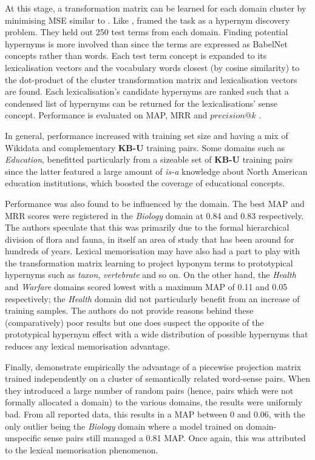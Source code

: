 At this stage, a transformation matrix can be learned for each domain cluster by minimising \ac{MSE} similar to \citep{Fu2014}.  Like \citeauthor{ustalov2017negative}, \citeauthor{espinosa2016supervised} framed the task as a hypernym discovery problem.  They held out 250 test terms from each domain.  Finding potential hypernyms is more involved than \citep{ustalov2017negative} since the terms are expressed as BabelNet concepts rather than words.  Each test term concept is expanded to its lexicalisation vectors and the vocabulary words closest (by cosine similarity) to the dot-product of the cluster transformation matrix and lexicalisation vectors are found.  Each lexicalisation’s candidate hypernyms are ranked such that a condensed list of hypernyms can be returned for the lexicalisations’ sense concept.  Performance is evaluated on \ac{MAP}, \ac{MRR} and $precision@k$ .

In general, performance increased with training set size and having a mix of Wikidata and complementary \textbf{KB-U} training pairs.   Some domains such as \textit{Education}, benefitted particularly from a sizeable set of \textbf{KB-U} training pairs since the latter featured a large amount of \textit{is-a} knowledge about North American education institutions, which boosted the coverage of educational concepts.

Performance was also found to be influenced by the domain.  The best \ac{MAP} and \ac{MRR} scores were registered in the \textit{Biology} domain at 0.84 and 0.83 respectively.  The authors speculate that this was primarily due to the formal hierarchical division of flora and fauna, in itself an area of study that has been around for hundreds of years.  Lexical memorisation \citep{levy2015supervised} may have also had a part to play with the transformation matrix learning to project hyponym terms to prototypical hypernyms such as \textit{taxon}, \textit{vertebrate} and so on.   On the other hand, the \textit{Health} and \textit{Warfare} domains scored lowest with a maximum \ac{MAP} of 0.11 and 0.05 respectively; the \textit{Health} domain did not particularly benefit from an increase of training samples.  The authors do not provide reasons behind these (comparatively) poor results but one does suspect the opposite of the prototypical hypernym effect with a wide distribution of possible hypernyms that reduces any lexical memorisation advantage.

Finally, \citeauthor{espinosa2016supervised} demonstrate empirically the advantage of a piecewise projection matrix trained independently on a cluster of semantically related word-sense pairs.  When they introduced a large number of random pairs (hence, pairs which were not formally allocated a domain) to the various domains, the results were uniformly bad.  From all reported data, this results in a \ac{MAP} between 0 and 0.06, with the only outlier being the \textit{Biology} domain where a model trained on domain-unspecific sense pairs still managed a 0.81 \ac{MAP}.  Once again, this was attributed to the lexical memorisation phenomenon. 

